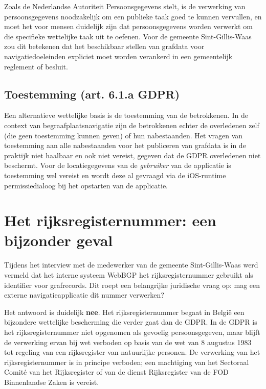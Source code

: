 Zoals de Nederlandse Autoriteit Persoonsgegevens stelt, is de verwerking van persoonsgegevens noodzakelijk om een publieke taak goed te kunnen vervullen, en moet het voor mensen duidelijk zijn dat persoonsgegevens worden verwerkt om die specifieke wettelijke taak uit te oefenen. Voor de gemeente Sint-Gillis-Waas zou dit betekenen dat het beschikbaar stellen van grafdata voor navigatiedoeleinden expliciet moet worden verankerd in een gemeentelijk reglement of besluit.

\subsection{Toestemming (art. 6.1.a GDPR)}

Een alternatieve wettelijke basis is de toestemming van de betrokkenen. In de context van begraafplaatsnavigatie zijn de betrokkenen echter de overledenen zelf (die geen toestemming kunnen geven) of hun nabestaanden. Het vragen van toestemming aan alle nabestaanden voor het publiceren van grafdata is in de praktijk niet haalbaar en ook niet vereist, gegeven dat de GDPR overledenen niet beschermt. Voor de locatiegegevens van de \textit{gebruiker} van de applicatie is toestemming wel vereist en wordt deze al gevraagd via de iOS-runtime permissiedialoog bij het opstarten van de applicatie.

\section{Het rijksregisternummer: een bijzonder geval}

Tijdens het interview met de medewerker van de gemeente Sint-Gillis-Waas werd vermeld dat het interne systeem WebBGP het rijksregisternummer gebruikt als identifier voor grafrecords. Dit roept een belangrijke juridische vraag op: mag een externe navigatieapplicatie dit nummer verwerken?

Het antwoord is duidelijk \textbf{nee}. Het rijksregisternummer begaat in België een bijzondere wettelijke bescherming die verder gaat dan de GDPR. In de GDPR is het rijksregisternummer niet opgenomen als gevoelig persoonsgegeven, maar blijft de verwerking ervan bij wet verboden op basis van de wet van 8 augustus 1983 tot regeling van een rijksregister van natuurlijke personen. De verwerking van het rijksregisternummer is in principe verboden; een machtiging van het Sectoraal Comité van het Rijksregister of van de dienst Rijksregister van de FOD Binnenlandse Zaken is vereist.

